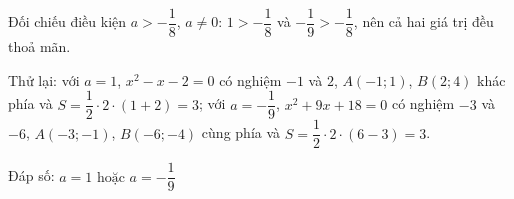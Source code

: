 \begin{problem}[9DS-HSB2-051]
\begin{solution}
Đối chiếu điều kiện $a > -\dfrac{1}{8}$, $a \neq 0$: $1 > -\dfrac{1}{8}$ và $-\dfrac{1}{9} > -\dfrac{1}{8}$, nên cả hai giá trị đều thoả mãn.

Thử lại: với $a = 1$, $x^2 - x - 2 = 0$ có nghiệm $-1$ và $2$, $A(-1; 1)$, $B(2; 4)$ khác phía và $S = \dfrac{1}{2} \cdot 2 \cdot (1 + 2) = 3$; với $a = -\dfrac{1}{9}$, $x^2 + 9x + 18 = 0$ có nghiệm $-3$ và $-6$, $A(-3; -1)$, $B(-6; -4)$ cùng phía và $S = \dfrac{1}{2} \cdot 2 \cdot (6 - 3) = 3$.

Đáp số: $\boxed{a = 1 \text{ hoặc } a = -\dfrac{1}{9}}$
\end{solution}
\end{problem}


